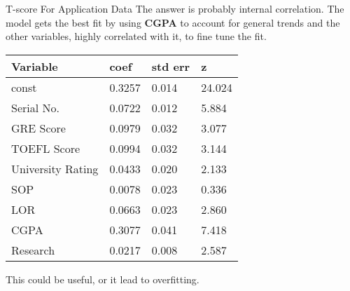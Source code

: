 \documentclass[10pt, table, dvipsnames,xcdraw, handout ]{beamer}
\begin{document}
\begin{frame}[fragile]{T-score For Application Data}
The answer is probably internal correlation. The model gets the best fit by using \textbf{CGPA} to account for general trends and the other variables, highly correlated with it, to fine tune the fit. 
\begin{table}[]
\begin{tabular}{llll}
\hline
\textbf{Variable} & \textbf{coef} & \multicolumn{1}{c}{\textbf{std err}} & \textbf{z} \\ \hline
const             & 0.3257        & 0.014                                & 24.024     \\
Serial No.        & 0.0722        & 0.012                                & 5.884      \\
GRE Score         & 0.0979        & 0.032                                & 3.077      \\
TOEFL Score       & 0.0994        & 0.032                                & 3.144      \\
University Rating & 0.0433        & 0.020                                & 2.133      \\
SOP               & 0.0078        & 0.023                                & 0.336      \\
LOR               & 0.0663        & 0.023                                & 2.860      \\
CGPA              & 0.3077        & 0.041                                & 7.418      \\
Research          & 0.0217        & 0.008                                & 2.587     
\end{tabular}
\end{table}
This could be useful, or it lead to overfitting. 
\end{frame}
\end{document}
